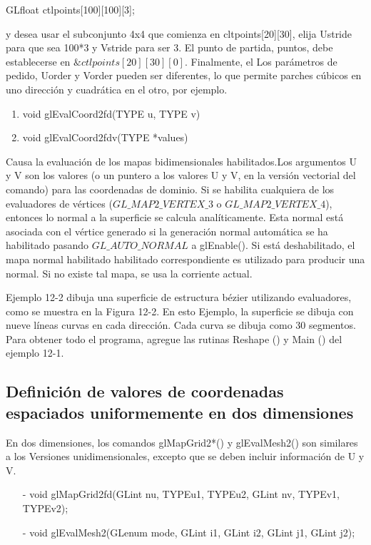 GLfloat ctlpoints[100][100][3];

y desea usar el subconjunto 4x4 que comienza en cltpoints[20][30], elija Ustride para que sea 100*3 y
Vstride para ser 3. El punto de partida, puntos, debe establecerse en $\&ctlpoints[20][30][0]$. Finalmente, el
Los parámetros de pedido, Uorder y Vorder pueden ser diferentes, lo que permite parches cúbicos en uno
dirección y cuadrática en el otro, por ejemplo.


\begin{enumerate}
    \item void glEvalCoord2{fd}(TYPE u, TYPE v)
    \item void glEvalCoord2{fd}v(TYPE *values)
\end{enumerate}
 
 
Causa la evaluación de los mapas bidimensionales habilitados.Los argumentos U y V son los valores
(o un puntero a los valores U y V, en la versión vectorial del comando) para las coordenadas de dominio.
Si se habilita cualquiera de los evaluadores de vértices ($ GL\_MAP2\_VERTEX\_3 $ o $ GL\_MAP2\_VERTEX\_4 $),
entonces lo normal a la superficie se calcula analíticamente. Esta normal está asociada con el
vértice generado si la generación normal automática se ha habilitado pasando
$GL\_AUTO\_NORMAL$ a glEnable(). Si está deshabilitado, el mapa normal habilitado habilitado correspondiente es
utilizado para producir una normal. Si no existe tal mapa, se usa la corriente actual.

Ejemplo 12-2 dibuja una superficie de estructura bézier utilizando evaluadores, como se muestra en la Figura 12-2. En esto
Ejemplo, la superficie se dibuja con nueve líneas curvas en cada dirección. Cada curva se dibuja como 30
segmentos. Para obtener todo el programa, agregue las rutinas Reshape () y Main () del ejemplo 12-1.



\subsection{Definición de valores de coordenadas espaciados uniformemente en dos dimensiones}

En dos dimensiones, los comandos glMapGrid2*() y glEvalMesh2() son similares a los
Versiones unidimensionales, excepto que se deben incluir información de U y V.

\begin{enumerate}
    \item[-] void glMapGrid2{fd}(GLint nu, TYPEu1, TYPEu2,
    GLint nv, TYPEv1, TYPEv2);
    \item[-] void glEvalMesh2(GLenum mode, GLint i1, GLint i2, GLint j1, GLint j2);
\end{enumerate}
 

